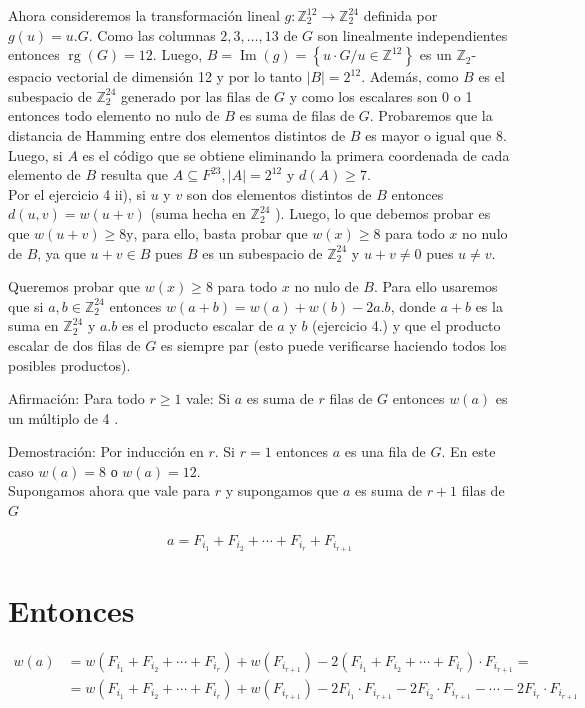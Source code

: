\documentclass[10pt]{article}
\begin{document}
Ahora consideremos la transformación lineal $g: \mathbb{Z}_{2}^{12} \longrightarrow \mathbb{Z}_{2}^{24}$ definida por $g(u)=u . G$. Como las columnas $2,3, \ldots, 13$ de $G$ son linealmente independientes entonces $\operatorname{rg}(G)=12$. Luego, $B=\operatorname{Im}(g)=\left\{u \cdot G / u \in \mathbb{Z}^{12}\right\}$ es un $\mathbb{Z}_{2}$-espacio vectorial de dimensión 12 y por lo tanto $|B|=2^{12}$. Además, como $B$ es el subespacio de $\mathbb{Z}_{2}^{24}$ generado por las filas de $G$ y como los escalares son 0 o 1 entonces todo elemento no nulo de $B$ es suma de filas de $G$. Probaremos que la distancia de Hamming entre dos elementos distintos de $B$ es mayor o igual que 8. Luego, si $A$ es el código que se obtiene eliminando la primera coordenada de cada elemento de $B$ resulta que $A \subseteq F^{23},|A|=2^{12}$ y $d(A) \geq 7$.\\
Por el ejercicio 4 ii), si $u$ y $v$ son dos elementos distintos de $B$ entonces $d(u, v)=w(u+v)$ (suma hecha en $\mathbb{Z}_{2}^{24}$ ). Luego, lo que debemos probar es que $w(u+v) \geq 8 \mathrm{y}$, para ello, basta probar que $w(x) \geq 8$ para todo $x$ no nulo de $B$, ya que $u+v \in B$ pues $B$ es un subespacio de $\mathbb{Z}_{2}^{24}$ y $u+v \neq 0$ pues $u \neq v$.

Queremos probar que $w(x) \geq 8$ para todo $x$ no nulo de $B$. Para ello usaremos que si $a, b \in \mathbb{Z}_{2}^{24}$ entonces $w(a+b)=w(a)+w(b)-2 a . b$, donde $a+b$ es la suma en $\mathbb{Z}_{2}^{24}$ y $a . b$ es el producto escalar de $a$ y $b$ (ejercicio 4.) y que el producto escalar de dos filas de $G$ es siempre par (esto puede verificarse haciendo todos los posibles productos).

Afirmación: Para todo $r \geq 1$ vale: Si $a$ es suma de $r$ filas de $G$ entonces $w(a)$ es un múltiplo de 4 .

Demostración: Por inducción en $r$. Si $r=1$ entonces $a$ es una fila de $G$. En este caso $w(a)=8$ о $w(a)=12$.\\
Supongamos ahora que vale para $r$ y supongamos que $a$ es suma de $r+1$ filas de $G$

$$
a=F_{i_{1}}+F_{i_{2}}+\cdots+F_{i_{r}}+F_{i_{r+1}}
$$

\section*{Entonces}
$$
\begin{aligned}
w(a) & =w\left(F_{i_{1}}+F_{i_{2}}+\cdots+F_{i_{r}}\right)+w\left(F_{i_{r+1}}\right)-2\left(F_{i_{1}}+F_{i_{2}}+\cdots+F_{i_{r}}\right) \cdot F_{i_{r+1}}= \\
& =w\left(F_{i_{1}}+F_{i_{2}}+\cdots+F_{i_{r}}\right)+w\left(F_{i_{r+1}}\right)-2 F_{i_{1}} \cdot F_{i_{r+1}}-2 F_{i_{2}} \cdot F_{i_{r+1}}-\cdots-2 F_{i_{r}} \cdot F_{i_{r+1}}
\end{aligned}
$$
\end{document}

